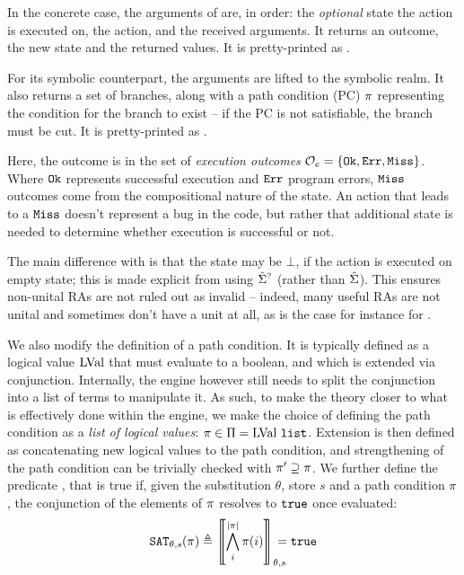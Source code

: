 In the concrete case, the arguments of \execac{} are, in order: the \emph{optional} state the action is executed on, the action, and the received arguments. It returns an outcome, the new state and the returned values. It is pretty-printed as .

For its symbolic counterpart, the arguments are lifted to the symbolic realm. It also returns a set of branches, along with a path condition (PC) $\pi$ representing the condition for the branch to exist -- if the PC is not satisfiable, the branch must be cut. It is pretty-printed as .

Here, the outcome is in the set of \emph{execution outcomes} ${\cal O}_e=\{ \texttt{Ok},\texttt{Err},\texttt{Miss} \}$. Where $\texttt{Ok}$ represents successful execution and $\texttt{Err}$ program errors, $\texttt{Miss}$ outcomes come from the compositional nature of the state. An action that leads to a $\texttt{Miss}$ doesn't represent a bug in the code, but rather that additional state is needed to determine whether execution is successful or not.

The main difference with \cite{cse2} is that the state may be $\bot$, if the action is executed on empty state; this is made explicit from using $\hat{\Sigma}^?$ (rather than $\hat{\Sigma}$). This ensures non-unital RAs are not ruled out as invalid -- indeed, many useful RAs are not unital and sometimes don't have a unit at all, as is the case for instance for \Ex.

We also modify the definition of a path condition. It is typically defined as a logical value $\text{LVal}$ that must evaluate to a boolean, and which is extended via conjunction. Internally, the engine however still needs to split the conjunction into a list of terms to manipulate it. As such, to make the theory closer to what is effectively done within the engine, we make the choice of defining the path condition as a \emph{list of logical values}: $\pi\in\Pi=\text{LVal}~\texttt{list}$. Extension is then defined as concatenating new logical values to the path condition, and strengthening of the path condition can be trivially checked with $\pi'\supseteq\pi$. We further define the predicate , that is true if, given the substitution $\theta$, store $s$ and a path condition $\pi$, the conjunction of the elements of $\pi$ resolves to $\texttt{true}$ once evaluated:
\begin{align*}
	\texttt{SAT}_{\mathit{\theta,s}}(\pi) \triangleq \left\llbracket \bigwedge_{i}^{|\pi|}\pi(i) \right\rrbracket_{\theta,s} \hspace{-1em} = \texttt{true}
\end{align*}

